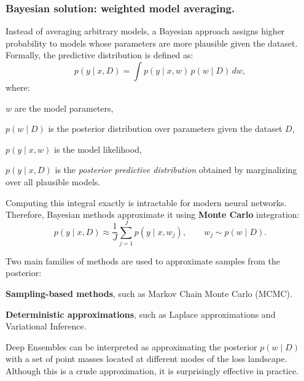 \subsubsection{Bayesian solution: weighted model averaging.}  
Instead of averaging arbitrary models, a Bayesian approach assigns higher probability to models whose parameters are more plausible given the dataset. Formally, the predictive distribution is defined as:
\[
p(y \mid x, D) = \int p(y \mid x, w) \, p(w \mid D) \, dw,
\]
where:
\begin{compactitemize}
    \item \(w\) are the model parameters,
    \item \(p(w \mid D)\) is the posterior distribution over parameters given the dataset \(D\),
    \item \(p(y \mid x, w)\) is the model likelihood,
    \item \(p(y \mid x, D)\) is the \emph{posterior predictive distribution} obtained by marginalizing over all plausible models.
\end{compactitemize}

Computing this integral exactly is intractable for modern neural networks. Therefore, Bayesian methods approximate it using \textbf{Monte Carlo} integration:
\[
p(y \mid x, D) \approx \frac{1}{J} \sum_{j=1}^{J} p(y \mid x, w_j), 
\qquad w_j \sim p(w \mid D).
\]

Two main families of methods are used to approximate samples from the posterior:
\begin{compactitemize}
    \item \textbf{Sampling-based methods}, such as Markov Chain Monte Carlo (MCMC).
    \item \textbf{Deterministic approximations}, such as Laplace approximations and Variational Inference.
\end{compactitemize}

\begin{infobox}
    Deep Ensembles can be interpreted as approximating the posterior \(p(w \mid D)\) with a set of 
    point masses located at different modes of the loss landscape. Although this is a crude approximation, 
    it is surprisingly effective in practice.
\end{infobox}

